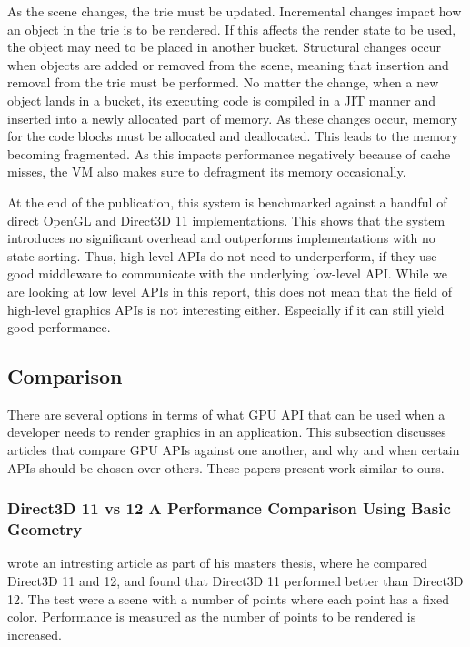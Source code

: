 As the scene changes, the trie must be updated.
Incremental changes impact how an object in the trie is to be rendered.
If this affects the render state to be used, the object may need to be placed in another bucket.
Structural changes occur when objects are added or removed from the scene, meaning that insertion and removal from the trie must be performed.
No matter the change, when a new object lands in a bucket, its executing code is compiled in a \gls{JIT} manner and inserted into a newly allocated part of memory.
As these changes occur, memory for the code blocks must be allocated and deallocated. 
This leads to the memory becoming fragmented.
As this impacts performance negatively because of cache misses, the \gls{VM} also makes sure to defragment its memory occasionally.

 
At the end of the publication, this system is benchmarked against a handful of direct OpenGL and Direct3D 11 implementations. 
This shows that the system introduces no significant overhead and outperforms implementations with no state sorting. 
Thus, high-level \glspl{API} do not need to underperform, if they use good middleware to communicate with the underlying low-level \gls{API}. 
While we are looking at low level \glspl{API} in this report, this does not mean that the field of high-level graphics \glspl{API} is not interesting either. 
Especially if it can still yield good performance.


\subsection{Comparison} 
There are several options in terms of what \gls{GPU} \gls{API} that can be used when a developer needs to render graphics in an application.
This subsection discusses articles that compare \gls{GPU} \glspl{API} against one another, and why and when certain \glspl{API} should be chosen over others.
These papers present work similar to ours.

\subsubsection{Direct3D 11 vs 12 A Performance Comparison Using Basic Geometry}

\citet{2016_direct3d} wrote an intresting article as part of his masters thesis, where he compared Direct3D 11 and 12, and found that Direct3D 11 performed better than Direct3D 12.
The test were a scene with a number of points where each point has a fixed color.
Performance is measured as the number of points to be rendered is increased.

